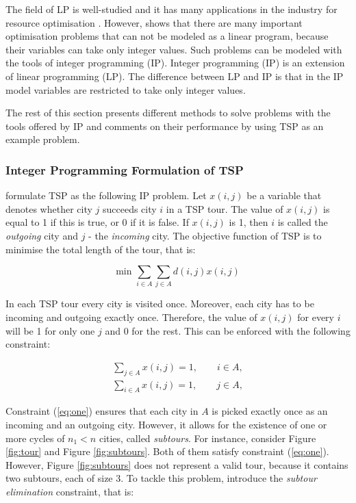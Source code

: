 \documentclass{mprop}
\theoremstyle{definition}
\begin{document}
The field of LP is well-studied \citep{Kantorovich60,DantzigLp63} and it has many applications in the industry for resource optimisation \citep{Jacovkis89,Garvin57}. However, \citet{Dantzig60} shows that there are many important optimisation problems that can not be modeled as a linear program, because their variables can take only integer values. Such problems can be modeled with the tools of integer programming (IP). Integer programming (IP) is an extension of linear programming (LP). The difference between LP and IP is that in the IP model variables are restricted to take only integer values.

The rest of this section presents different methods to solve problems with the tools offered by IP and comments on their performance by using TSP as an example problem.

\subsubsection{Integer Programming Formulation of TSP}
\label{sec:iptspformulation}

\citet{Dantzig54} formulate TSP as the following IP problem. Let $x(i,j)$ be a variable that denotes whether city $j$ succeeds city $i$ in a TSP tour. The value of $x(i,j)$ is equal to 1 if this is true, or 0 if it is false. If $x(i,j)$ is 1, then $i$ is called the \textit{outgoing} city and $j$ - the \textit{incoming} city. The objective function of TSP is to minimise the total length of the tour, that is:

\begin{equation}
\label{eq:objfunc}
\textrm{min } \sum_{i\in A}\sum_{j\in A} d(i,j)x(i,j)
\end{equation}

In each TSP tour every city is visited once. Moreover, each city has to be incoming and outgoing exactly once. Therefore, the value of $x(i,j)$ for every $i$ will be 1 for only one $j$ and 0 for the rest. This can be enforced with the following constraint:

\begin{equation}
\label{eq:one}
\begin{split}
  \sum_{j \in A} x(i,j) = 1, \qquad i \in A,\\
  \sum_{i \in A} x(i,j) = 1, \qquad j \in A,
\end{split}
\end{equation}

Constraint (\ref{eq:one}) ensures that each city in $A$ is picked exactly once as an incoming and an outgoing city. However, it allows for the existence of one or more cycles of $n_{1} < n$ cities, called \textit{subtours}. For instance, consider Figure \ref{fig:tour} and Figure \ref{fig:subtours}. Both of them satisfy constraint (\ref{eq:one}). However, Figure \ref{fig:subtours} does not represent a valid tour, because it contains two subtours, each of size 3. To tackle this problem, \citet{Dantzig54} introduce the \textit{subtour elimination} constraint, that is:
\end{document}
